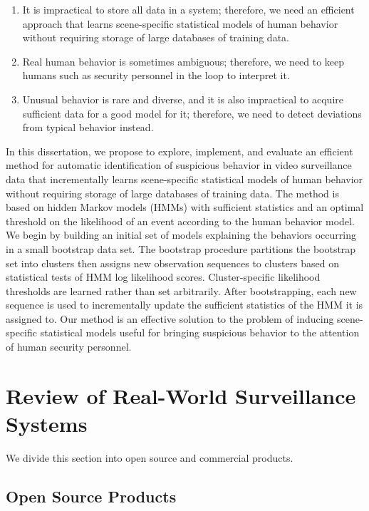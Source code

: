 \begin{enumerate}
    \item It is impractical to store all data in a system; therefore, we
        need an efficient approach that learns scene-specific statistical
        models of human behavior without requiring storage of large
        databases of training data.
    \item Real human behavior is sometimes ambiguous; therefore, we need to 
        keep humans such as security personnel in the loop to interpret it.
    \item Unusual behavior is rare and diverse, and it is also impractical 
        to acquire sufficient data for a good model for it; therefore, we 
        need to detect deviations from typical behavior instead.
\end{enumerate}

In this dissertation, we propose to explore, implement, and evaluate
an efficient method for automatic identification of suspicious
behavior in video surveillance data that incrementally learns
scene-specific statistical models of human behavior without requiring
storage of large databases of training data. The method is based on
hidden Markov models (HMMs) with sufficient statistics and an optimal
threshold on the likelihood of an event according to the human
behavior model.  We begin by building an initial set of models
explaining the behaviors occurring in a small bootstrap data set. The
bootstrap procedure partitions the bootstrap set into clusters then
assigns new observation sequences to clusters based on statistical
tests of HMM log likelihood scores. Cluster-specific likelihood
thresholds are learned rather than set arbitrarily. After
bootstrapping, each new sequence is used to incrementally update the
sufficient statistics of the HMM it is assigned to. Our method is an
effective solution to the problem of inducing scene-specific
statistical models useful for bringing suspicious behavior to the
attention of human security personnel.

\section{Review of Real-World Surveillance Systems}

We divide this section into open source and commercial products.

\subsection{Open Source Products}

